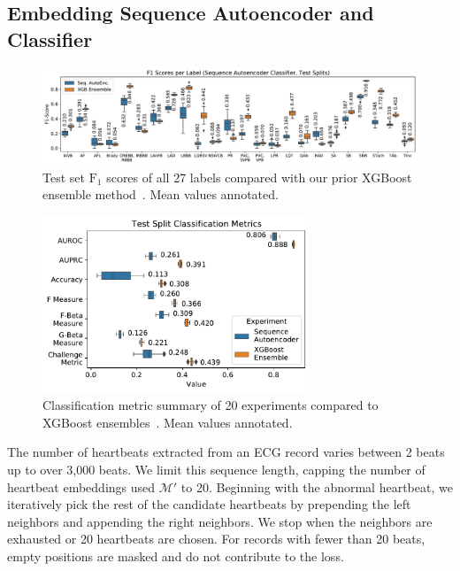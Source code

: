 \documentclass[\main/thesis.tex]{subfiles}
\begin{document}
\subsection{Embedding Sequence Autoencoder and Classifier}
\label{ssec:aenc_seq_embedding}

\begin{figure}[b]
    \centering
    \includegraphics[trim={0.15cm 0.35cm 0.2cm 0.25cm},clip,width=\textwidth]{figure/aenc_label_f1s.pdf}
    \caption[Test set $\text{F}_1$ scores of all 27 labels compared with our prior XGBoost ensemble method. Mean values annotated.]{Test set $\text{F}_1$ scores of all 27 labels compared with our prior XGBoost ensemble method~\cite{wong2020CINC-multilabel-ECG}. Mean values annotated.}
    \label{fig:label_f1s}
\end{figure}

\begin{figure}[b]
    \centering
    \includegraphics[trim={0.2cm 0.3cm 0.2cm 0.1cm},clip,width=8cm]{figure/aenc_classification_metrics.pdf}
    \caption[Classification metric summary of 20 experiments compared to XGBoost ensembles. Mean values annotated.]{Classification metric summary of 20 experiments compared to XGBoost ensembles~\cite{wong2020CINC-multilabel-ECG}. Mean values annotated.}
    \label{fig:classification_metrics}
\end{figure}

The number of heartbeats extracted from an ECG record varies between 2 beats up to over 3,000 beats.
We limit this sequence length, capping the number of heartbeat embeddings used $\mathcal{M'}$ to 20.
Beginning with the abnormal heartbeat, we iteratively pick the rest of the candidate heartbeats by prepending the left neighbors and appending the right neighbors.
We stop when the neighbors are exhausted or 20 heartbeats are chosen.
For records with fewer than 20 beats, empty positions are masked and do not contribute to the loss.
\end{document}
